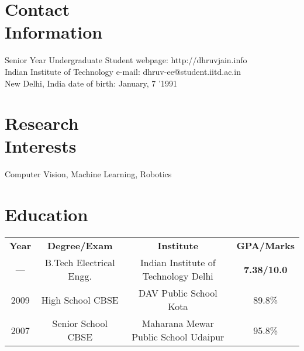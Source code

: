 \documentclass[margin,line]{resume}
\begin{document}
\begin{resume}

    \section{\mysidestyle Contact\\Information}

    Senior Year Undergraduate Student \hfill webpage: http://dhruvjain.info \vspace{0mm}\\\vspace{0mm}%
    Indian Institute of Technology \hfill e-mail: dhruv-ee@student.iitd.ac.in\vspace{0mm}\\\vspace{-4.5mm}%
    New Delhi, India		   \hfill date of birth: January, 7 '1991 \vspace{0mm}\\\vspace{1.5mm}%

    \section{\mysidestyle Research\\Interests}
    Computer Vision, Machine Learning, Robotics \vspace{2mm}

    \section{\mysidestyle Education}
    
    \begin{tabular}{c c c c}
    \textbf{Year} & \textbf{Degree/Exam} & \textbf{Institute} & \textbf{GPA/Marks} \\
    --- & B.Tech Electrical Engg. & Indian Institute of Technology Delhi & \textbf{7.38/10.0} \\
    2009 & High School CBSE & DAV Public School Kota & 89.8\% \\
    2007 & Senior School CBSE & Maharana Mewar Public School Udaipur & 95.8\%
	

\end{tabular}
\end{resume}
\end{document}

